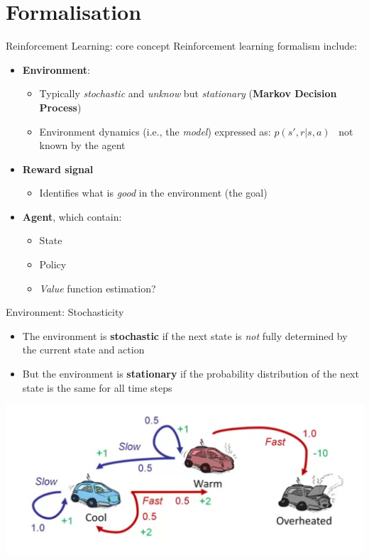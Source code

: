 \documentclass[presentation, 9pt]{beamer}\mode<presentation>{\usetheme{AMSBolognaFC}}
\begin{document}
\section{Formalisation}
\begin{frame}{Reinforcement Learning: core concept}
Reinforcement learning formalism include:
\begin{itemize}
	\item \textbf{Environment}:
	\begin{itemize}
		\item Typically \emph{stochastic} and \emph{unknow} but \emph{stationary} (\textbf{Markov Decision Process})
		\item Environment dynamics (i.e., the \emph{model}) expressed as: $p(s', r | s, a)$ \faArrowRight \, not known by the agent
	\end{itemize}
	\item \textbf{Reward signal} 
	\begin{itemize}
		\item Identifies what is \emph{good} in the environment (the goal)
	\end{itemize}
	\item \textbf{Agent}, which contain:
	\begin{itemize}	
		\item State
		\item Policy
		\item \emph{Value} function estimation?
	\end{itemize}
\end{itemize}
\end{frame}
\begin{frame}{Environment: Stochasticity}
\begin{itemize}
	\item The environment is \textbf{stochastic} if the next state is \emph{not} fully determined by the current state and action
	\item But the environment is \textbf{stationary} if the probability distribution of the next state is the same for all time steps
\end{itemize}
\includegraphics[width=\textwidth]{img/env-dynamics.png}
\end{frame}
\end{document}
